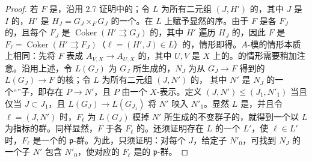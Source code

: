 \begin{proof}
若 $F$ 是，沿用 2.7 证明中的；令 $L$ 为所有二元组 $(J,H')$ 的，其中 $J$ 是 $I$ 的，$H'$ 是 $H_J=G_J\times_FG_J$ 的一个。在 $L$ 上赋予显然的序。由于 $F$ 是各 $F_J$ 的，且每个 $F_J$ 是 $\operatorname{Coker}(H'\rightrightarrows G_J)$ 的，其中 $H'$ 遍历 $H_J$ 的，因此 $F$ 是 $F_\ell=\operatorname{Coker}(H'\rightrightarrows F_J)$（$\ell=(H',J)\in L$）的，情形即得。$A$-模的情形本质上相同：先将 $F$ 表成 $A_{V,X}\to A_{U,X}$ 的，其中 $U,V$ 是 $X$ 上的。的情形需要稍加注意。沿用上述，令 $L(G_J)$ 为 $G_J$ 所生成的，$N_J$ 为从 $G_J\to F$ 得到的 $L(G_J)\to F$ 的核；令 $L$ 为所有二元组 $(J,N')$ 的，
其中 $N'$ 是 $N_J$ 的一个“”子，即存在 $P\to N'$，且 $P$ 由一个 $X$-表示。定义 $(J,N')\le(J_1,N'_1)$ 当且仅当 $J\subset J_1$，且 $L(G_J)\to L(G_{J_1})$ 将 $N'$ 映入 $N'_1$。显然 $L$ 是，并且令 $\ell=(J,N')$ 时，$F_\ell$ 为 $L(G_J)$ 模掉 $N'$ 所生成的不变群子的，就得到一个以 $L$ 为指标的群。同样显然，$F$ 于各 $F_\ell$ 的。还须证明存在 $L$ 的一个 $L'$，使 $\ell\in L'$ 时，$F_\ell$ 是一个的 $\mathfrak p$-群。为此，只须证明：对每个 $J$，给定子 $N'_0$，可找到 $N_J$ 的一个子 $N'$ 包含 $N'_0$，使对应的 $F_\ell$ 是的 $\mathfrak p$-群。


\end{proof}
